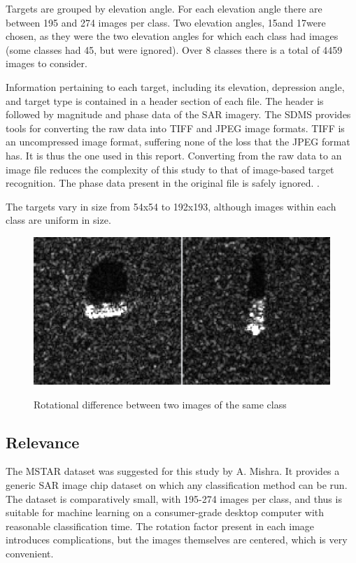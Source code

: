 Targets are grouped by elevation angle. For each elevation angle there are between 195 and 274 images per class. Two elevation angles, 15\degree and 17\degree were chosen, as they were the two elevation angles for which each class had images (some classes had 45\degree, but were ignored). Over 8 classes there is a total of 4459 images to consider.

Information pertaining to each target, including its elevation, depression angle, and target type is contained in a header section of each file. The header is followed by magnitude and phase data of the SAR imagery. The SDMS provides tools for converting the raw data into TIFF and JPEG image formats. TIFF is an uncompressed image format, suffering none of the loss that the JPEG format has. It is thus the one used in this report. Converting from the raw data to an image file reduces the complexity of this study to that of image-based target recognition. The phase data present in the original file is safely ignored. \cite{Schumacher_atrof}. 

The targets vary in size from 54x54 to 192x193, although images within each class are uniform in size.

\begin{figure}
	\centering
	\includegraphics[width=\textwidth]{figures/sar_differences}
	\label{fig:sar_differences}
	\caption{Rotational difference between two images of the same class}
	\centering
\end{figure}


\subsection{Relevance}
The MSTAR dataset was suggested for this study by A. Mishra. It provides a generic SAR image chip dataset on which any classification method can be run. The dataset is comparatively small, with 195-274 images per class, and thus is suitable for machine learning on a consumer-grade desktop computer with reasonable classification time. The rotation factor present in each image introduces complications, but the images themselves are centered, which is very convenient. 





